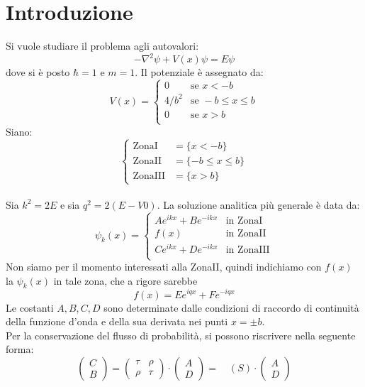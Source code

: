 \section{Introduzione}
Si vuole studiare il problema agli autovalori:
$$ -\nabla^2\psi + V(x)\psi = E \psi $$
dove si è posto $\hbar = 1$ e $m = 1$. Il potenziale è assegnato da:
$$ V(x)  = \begin{cases}
        0       & \mbox{se } x<-b \\
        4/b^2   & \mbox{se } -b \leq x \leq b \\
        0       & \mbox{se } x>b \\
         \end{cases}
$$
Siano:
$$ \begin{cases}
    \mbox{ZonaI} & = \{x<-b \} \\
    \mbox{ZonaII} & = \{-b \leq x \leq b\} \\
    \mbox{ZonaIII} & = \{x>b\}
\end{cases} $$
\\
Sia $k^2 = 2E$ e sia $q^2 = 2(E-V0)$. La soluzione analitica più generale è data da:
$$\psi_k(x) =
    \begin{cases}
        Ae^{ikx}+Be^{-ikx} & \mbox{in ZonaI} \\
        f(x) & \mbox{in ZonaII} \\
        Ce^{ikx}+De^{-ikx} & \mbox{in ZonaIII} \\
    \end{cases}
$$
Non siamo per il momento interessati alla ZonaII, quindi indichiamo con
$f(x)$ la $\psi_k(x)$ in tale zona, che a rigore sarebbe
    $$f(x)= Ee^{iqx}+Fe^{-iqx}$$
Le costanti $A,B,C,D$ sono determinate dalle condizioni di raccordo di continuità della
funzione d'onda e della sua derivata nei punti $x=\pm b$.\\
Per la conservazione del flusso di probabilità, si possono riscrivere nella seguente forma:
$$
\begin{pmatrix} C \\ B \end{pmatrix} =
\begin{pmatrix} \tau & \rho \\ \rho & \tau \end{pmatrix} \cdot
\begin{pmatrix} A \\ D \end{pmatrix} = \quad (S)\cdot \begin{pmatrix} A \\ D \end{pmatrix}
$$
